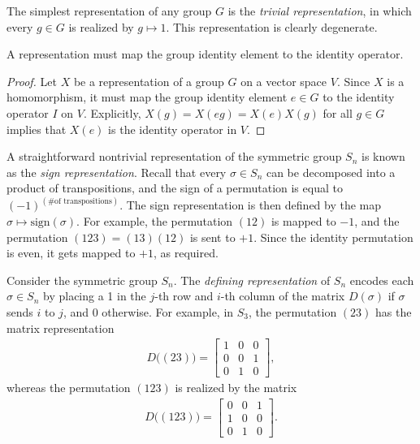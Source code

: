 \begin{example}
    The simplest representation of any group $G$ is the \textit{trivial representation}, in which every $g\in G$ is realized by $g\mapsto 1$. This representation is clearly degenerate.
\end{example}

\begin{remark}
    A representation must map the group identity element to the identity operator.
\end{remark}
\begin{proof}
    Let $X$ be a representation of a group $G$ on a vector space $V$. Since $X$ is a homomorphism, it must map the group identity element $e\in G$ to the identity operator $I$ on $V$. Explicitly, $X(g) = X(eg) = X(e)X(g)$ for all $g\in G$ implies that $X(e)$ is the identity operator in $V$.
\end{proof}

\begin{example}
    A straightforward nontrivial representation of the symmetric group $S_n$ is known as the \textit{sign representation}. Recall that every $\sigma\in S_n$ can be decomposed into a product of transpositions, and the sign of a permutation is equal to ${(-1)}^{(\textrm{\# of transpositions})}$. The sign representation is then defined by the map $\sigma\mapsto\textrm{sign}(\sigma)$. For example, the permutation $(12)$ is mapped to $-1$, and the permutation $(123) = (13)(12)$ is sent to $+1$. Since the identity permutation is even, it gets mapped to $+1$, as required.
\end{example}

\begin{example}
    Consider the symmetric group $S_n$. The \textit{defining representation} of $S_n$ encodes each $\sigma\in S_n$ by placing a 1 in the $j$-th row and $i$-th column of the matrix $D(\sigma)$ if $\sigma$ sends $i$ to $j$, and 0 otherwise. For example, in $S_3$, the permutation $(23)$ has the matrix representation
    \begin{align*}
        D\big((23)\big) = \begin{bmatrix} 1 & 0 & 0 \\ 0 & 0 & 1 \\ 0 & 1 & 0 \end{bmatrix},
    \end{align*}
    whereas the permutation $(123)$ is realized by the matrix
    \begin{align*}
        D\big((123)\big) = \begin{bmatrix} 0 & 0 & 1 \\ 1 & 0 & 0 \\ 0 & 1 & 0 \end{bmatrix}.
    \end{align*}
\end{example}

